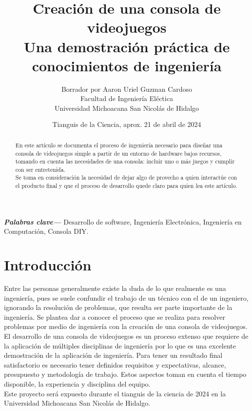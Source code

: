\documentclass[letterpaper]{article}
\begin{document}
\title{
    {\Huge Creación de una consola de videojuegos}\\
    {\LARGE Una demostración práctica de conocimientos de ingeniería}
}
\author{
    {\large Borrador por Aaron Uriel Guzman Cardoso}\\
    {\large Facultad de Ingeniería Eléctica}\\
    {\large Universidad Michoacana San Nicolás de Hidalgo}\\
}
\date{Tianguis de la Ciencia, aprox. 21 de abril de 2024}
\maketitle

\newpage
\begin{multicols}{2}

\begin{abstract}
    En este artículo se documenta el proceso de ingeniería necesario para
    diseñar una consola de videojuegos simple a partir de un entorno de hardware
    bajos recursos, tomando en cuenta las necesidades de una consola: incluir
    uno o más juegos y cumplir con ser entretenida.\\
    Se toma en consideración la necesidad de dejar algo de provecho a quien
    interactúe con el producto final y que el proceso de desarrollo quede claro
    para quien lea este artículo.
\end{abstract}

\textbf{\textit{Palabras clave—}} Desarrollo de software, Ingeniería Electrónica,
Ingeniería en Computación, Consola DIY.

\section{Introducción}
Entre las personas generalmente existe la duda de lo que realmente es una
ingeniería, pues se suele confundir el trabajo de un técnico con el de un
ingeniero, ignorando la resolución de problemas, que resulta ser parte
importante de la ingeniería. Se plantea dar a conocer el proceso que se realiza
para resolver problemas por medio de ingeniería con la creación de una consola
de videojuegos.\\
El desarrollo de una consola de videojuegos es un proceso extenso que
requiere de la aplicación de múltiples disciplinas de ingeniería por lo que
es una excelente demostración de la aplicación de ingeniería. Para tener un
resultado final satisfactorio es necesario tener definidos requisitos y
expectativas, alcance, presupuesto y metodología de trabajo. Estos
aspectos toman en cuenta el tiempo disponible, la experiencia y disciplina del
equipo.\\
Este proyecto será expuesto durante el tianguis de la ciencia de 2024 en la
Universidad Michoacana San Nicolás de Hidalgo.


\end{multicols}
\end{document}
